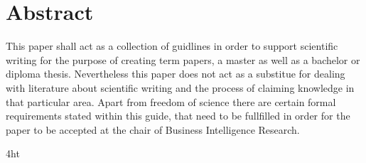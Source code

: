 \documentclass[
               fontsize=12pt, %
               paper=a4,
               oneside,  %
               BCOR=3mm, %
               DIV=13,   %
               headinclude=true,
               footinclude=false,
               bibliography=totoc,
               headsepline,
               parskip=half,
               final,   %
			numbers=noenddot
               ]{scrbook}
\begin{document}
\section*{Abstract}
This paper shall act as a collection of guidlines in order to support scientific writing for the purpose of creating term papers, a master as well as a bachelor or diploma thesis. Nevertheless this paper does not act as a substitue for dealing with literature about scientific writing and the process of claiming knowledge in that particular area. Apart from freedom of science there are certain formal requirements stated within this guide, that need to be fullfilled in order for the paper to be accepted at the chair of Business Intelligence Research.

\cleardoublepage



\iftex4ht
\else
{}
\fi

%
%

%
%
%

\setcounter{page}{1} 

\tableofcontents


\listoffigures
\ifdeutsch
{}
\else
{}
\fi

\listoftables
\ifdeutsch
{}
\else
{}
\fi

\ifdeutsch
{}
\else
{}
\fi
\end{document}
